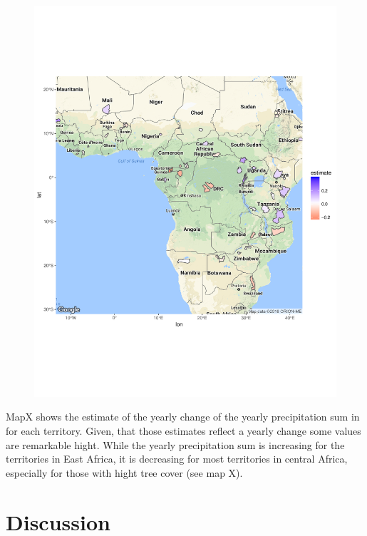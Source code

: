 \documentclass[12pt,twoside,a4paper,final]{report}
\begin{document}
\begin{center}
   \begin{figure}[h]
     \begin{center}
       \includegraphics[width=15cm]{images/sample_session_3_change_map.pdf}
    \end{center}
  \end{figure}
\end{center}



MapX shows the estimate of the yearly change of the yearly precipitation sum in for each territory. Given, that those estimates reflect a yearly change some values are remarkable hight. While the yearly precipitation sum is increasing for the territories in East Africa, it is decreasing for most territories in central Africa, especially for those with hight tree cover (see map X).


\chapter{Discussion}
\end{document}
